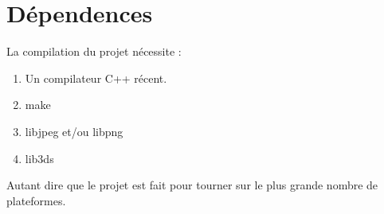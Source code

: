\section{Dépendences}
La compilation du projet nécessite :
\begin{enumerate}
  \item Un compilateur C++ récent.
  \item make
  \item libjpeg et/ou libpng
  \item lib3ds
\end{enumerate}

Autant dire que le projet est fait pour tourner sur le plus grande nombre de
plateformes.
